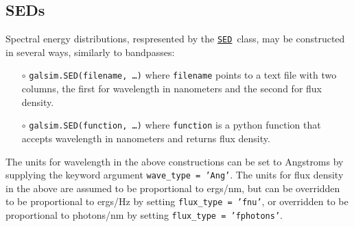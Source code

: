 \documentclass[preprint,10pt]{../../devel/modules/aastex}
\newcommand\SED{\href{http://galsim-developers.github.io/GalSim/classgalsim_1_1sed_1_1_s_e_d.html}{\texttt{SED}}}
\begin{document}
\subsection{SEDs}
Spectral energy distributions, respresented by the \SED\ class,
may be constructed in several ways, similarly to bandpasses:
\begin{itemize}
\item[$\circ$] \texttt{galsim.SED(filename, \dots)} \newline where \texttt{filename} points to a
  text file with two columns, the first for wavelength in nanometers and the second for flux
  density.
\item[$\circ$] \texttt{galsim.SED(function, \dots)} \newline where \texttt{function} is a python
  function that accepts wavelength in nanometers and returns flux density.
\end{itemize}

The units for wavelength in the above constructions can be set to Angstroms by supplying the keyword
argument \texttt{wave\_type = 'Ang'}.  The units for flux density in the above are assumed to be
proportional to ergs/nm, but can be overridden to be proportional to ergs/Hz by setting
\texttt{flux\_type = 'fnu'}, or overridden to be proportional to photons/nm by setting
\texttt{flux\_type = 'fphotons'}.
\end{document}
